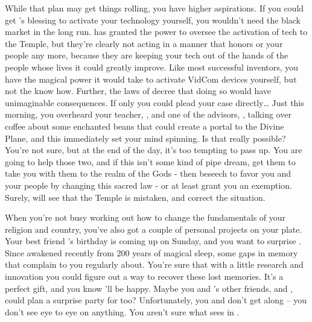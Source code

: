 \documentclass[char]{GL2020}
\begin{document}
While that plan may get things rolling, you have higher aspirations. If you could get \cTechGod{}'s blessing to activate your technology yourself, you wouldn't need the black market in the long run. \cTechGod{} has granted the power to oversee the activation of tech to the Temple, but they're clearly not acting in a manner that honors \cTechGod{} or your people any more, because they are keeping your tech out of the hands of the people whose lives it could greatly improve. Like most successful inventors, you have the magical power it would take to activate VidCom devices yourself, but not the know how. Further, the laws of \cTechGod{} decree that doing so would have unimaginable consequences. If only you could plead your case directly\ldots{} Just this morning, you overheard your teacher, \cFlowPriest{\full}, and one of the advisors, \cCurse{\full}, talking over coffee about some enchanted beans that could create a portal to the Divine Plane, and this immediately set your mind spinning. Is that really possible? You're not sure, but at the end of the day, it's too tempting to pass up. You are going to help those two, and if this isn't some kind of pipe dream, get them to take you with them to the realm of the Gods - then beseech \cTechGod{} to favor you and your people by changing this sacred law - or at least grant you an exemption. Surely, \cTechGod{} will see that the Temple is mistaken, and correct the situation.

When you're not busy working out how to change the fundamentals of your religion and country, you've also got a couple of personal projects on your plate. Your best friend \cDisney{\full}'s birthday is coming up on Sunday, and you want to surprise \cDisney{\them}. Since \cDisney{\them} \cDisney{\were} awakened recently from 200 years of magical sleep, \cDisney{\they} \cDisney{\have} some gaps in \cDisney{\their} memory that \cDisney{\they} complain to you regularly about. You're sure that with a little research and innovation you could figure out a way to recover these lost memories. It's a perfect gift, and you know \cDisney{\they}'ll be happy. Maybe you and \cDisney{}'s other friends, \cAdopted{\full} and \cPirateChild{\full}, could plan a surprise party for \cDisney{\them} too? Unfortunately, you and \cPirateChild{} don't get along – you don't see eye to eye on anything. You aren't sure what \cDisney{} sees in \cPirateChild{\them}.
\end{document}
